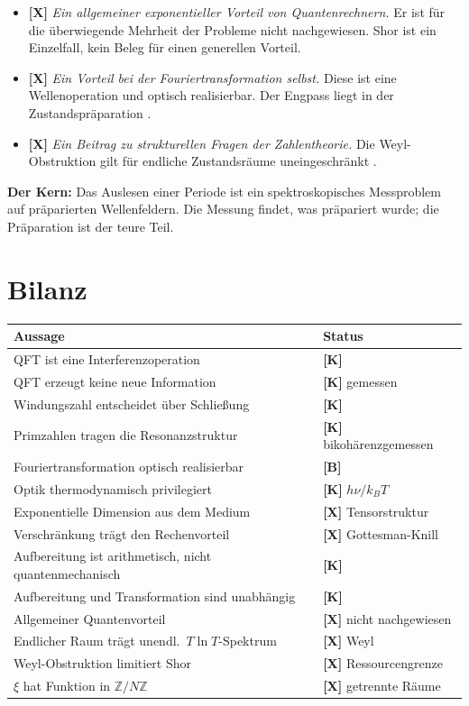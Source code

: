 \begin{itemize}
  \item \textbf{[X]} \emph{Ein allgemeiner exponentieller Vorteil von
    Quantenrechnern.} Er ist für die überwiegende Mehrheit der Probleme nicht
    nachgewiesen. Shor ist ein Einzelfall, kein Beleg für einen generellen
    Vorteil.
  \item \textbf{[X]} \emph{Ein Vorteil bei der Fouriertransformation selbst.}
    Diese ist eine Wellenoperation und optisch realisierbar. Der Engpass liegt
    in der Zustandspräparation \cite{Nielsen2010}.
  \item \textbf{[X]} \emph{Ein Beitrag zu strukturellen Fragen der
    Zahlentheorie.} Die Weyl-Obstruktion gilt für endliche Zustandsräume
    uneingeschränkt \cite{Dok316}.
\end{itemize}

\textbf{Der Kern:} Das Auslesen einer Periode ist ein spektroskopisches
Messproblem auf präparierten Wellenfeldern. Die Messung findet, was präpariert
wurde; die Präparation ist der teure Teil.

\section{Bilanz}

\begin{center}
\begin{tabular}{ll}
\toprule
Aussage & Status \\
\midrule
QFT ist eine Interferenzoperation & \textbf{[K]} \\
QFT erzeugt keine neue Information & \textbf{[K]} gemessen \\
Windungszahl entscheidet über Schließung & \textbf{[K]} \\
Primzahlen tragen die Resonanzstruktur & \textbf{[K]} bikohärenzgemessen \\
Fouriertransformation optisch realisierbar & \textbf{[B]} \\
Optik thermodynamisch privilegiert & \textbf{[K]} $h\nu/k_BT$ \\
Exponentielle Dimension aus dem Medium & \textbf{[X]} Tensorstruktur \\
Verschränkung trägt den Rechenvorteil & \textbf{[X]} Gottesman-Knill \\
Aufbereitung ist arithmetisch, nicht quantenmechanisch & \textbf{[K]} \\
Aufbereitung und Transformation sind unabhängig & \textbf{[K]} \\
Allgemeiner Quantenvorteil & \textbf{[X]} nicht nachgewiesen \\
Endlicher Raum trägt unendl.\ $T\ln T$-Spektrum & \textbf{[X]} Weyl \\
Weyl-Obstruktion limitiert Shor & \textbf{[X]} Ressourcengrenze \\
$\xi$ hat Funktion in $\mathbb{Z}/N\mathbb{Z}$ & \textbf{[X]} getrennte Räume \\
\bottomrule
\end{tabular}
\end{center}

